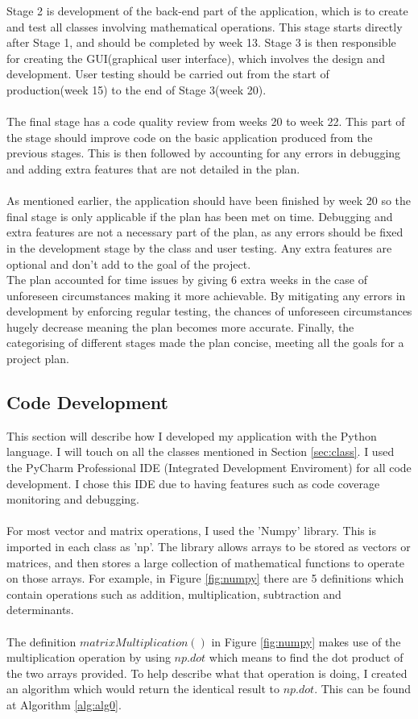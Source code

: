 \documentclass[final]{cmpreport}
\begin{document}
	Stage 2 is development of the back-end part of the application, which is to create and test all classes involving mathematical operations. This stage starts directly after Stage 1, and should be completed by week 13. Stage 3 is then responsible for creating the GUI(graphical user interface), which involves the design and development. User testing should be carried out from the start of production(week 15) to the end of Stage 3(week 20).\\
	\\The final stage has a code quality review from weeks 20 to week 22. This part of the stage should improve code on the basic application produced from the previous stages. This is then followed by accounting for any errors in debugging and adding extra features that are not detailed in the plan.\\
	\\As mentioned earlier, the application should have been finished by week 20 so the final stage is only applicable if the plan has been met on time. Debugging and extra features are not a necessary part of the plan, as any errors should be fixed in the development stage by the class and user testing. Any extra features are optional and don't add to the goal of the project.\\
	The plan accounted for time issues by giving 6 extra weeks in the case of unforeseen circumstances making it more achievable. By mitigating any errors in development by enforcing regular testing, the chances of unforeseen circumstances hugely decrease meaning the plan becomes more accurate. Finally, the categorising of different stages made the plan concise, meeting all the goals for a project plan.

	
	\subsection{Code Development}
	
	This section will describe how I developed my application with the Python language. I will touch on all the classes mentioned in Section \ref{sec:class}. I used the PyCharm Professional IDE (Integrated Development Enviroment) for all code development. I chose this IDE due to having features such as code coverage monitoring and debugging.\\
	\\For most vector and matrix operations, I used the 'Numpy' library. This is imported in each class as 'np'. The library allows arrays to be stored as vectors or matrices, and then stores a large collection of mathematical functions to operate on those arrays. For example, in Figure \ref{fig:numpy} there are 5 definitions which contain operations such as addition, multiplication, subtraction and determinants.\\ 
	\\The definition $matrixMultiplication()$ in Figure \ref{fig:numpy} makes use of the multiplication operation by using $np.dot$ which means to find the dot product of the two arrays provided. To help describe what that operation is doing, I created an algorithm which would return the identical result to $np.dot$. This can be found at Algorithm \ref{alg:alg0}.
	
\end{document}
